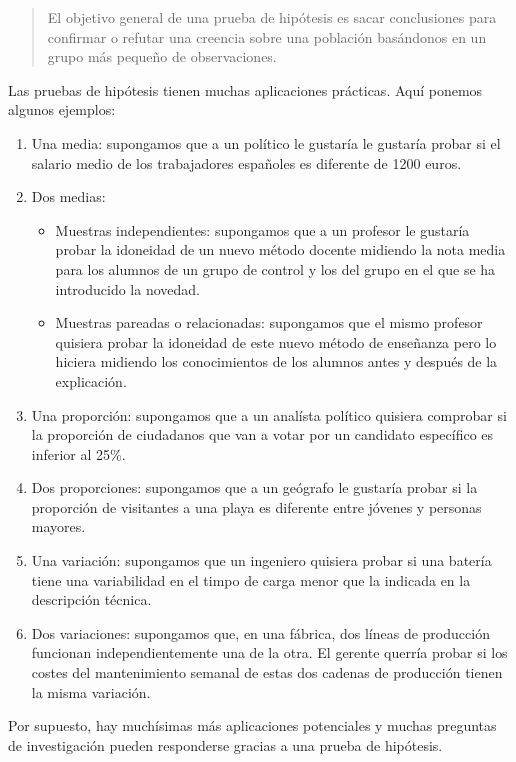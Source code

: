 \documentclass[
]{book}
\providecommand{\tightlist}{%
  \setlength{\itemsep}{0pt}\setlength{\parskip}{0pt}}
\begin{document}
\begin{quote}
El objetivo general de una prueba de hipótesis es sacar conclusiones para confirmar o refutar una creencia sobre una población basándonos en un grupo más pequeño de observaciones.
\end{quote}

Las pruebas de hipótesis tienen muchas aplicaciones prácticas. Aquí ponemos algunos ejemplos:

\begin{enumerate}
\def\labelenumi{\arabic{enumi}.}
\tightlist
\item
  Una media: supongamos que a un político le gustaría le gustaría probar si el salario medio de los trabajadores españoles es diferente de 1200 euros.
\item
  Dos medias:

  \begin{itemize}
  \tightlist
  \item
    Muestras independientes: supongamos que a un profesor le gustaría probar la idoneidad de un nuevo método docente midiendo la nota media para los alumnos de un grupo de control y los del grupo en el que se ha introducido la novedad.
  \item
    Muestras pareadas o relacionadas: supongamos que el mismo profesor quisiera probar la idoneidad de este nuevo método de enseñanza pero lo hiciera midiendo los conocimientos de los alumnos antes y después de la explicación.
  \end{itemize}
\item
  Una proporción: supongamos que a un analísta político quisiera comprobar si la proporción de ciudadanos que van a votar por un candidato específico es inferior al 25\%.
\item
  Dos proporciones: supongamos que a un geógrafo le gustaría probar si la proporción de visitantes a una playa es diferente entre jóvenes y personas mayores.
\item
  Una variación: supongamos que un ingeniero quisiera probar si una batería tiene una variabilidad en el timpo de carga menor que la indicada en la descripción técnica.
\item
  Dos variaciones: supongamos que, en una fábrica, dos líneas de producción funcionan independientemente una de la otra. El gerente querría probar si los costes del mantenimiento semanal de estas dos cadenas de producción tienen la misma variación.
\end{enumerate}

Por supuesto, hay muchísimas más aplicaciones potenciales y muchas preguntas de investigación pueden responderse gracias a una prueba de hipótesis.
\end{document}
